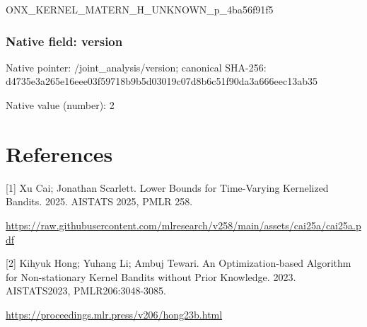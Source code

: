 \documentclass[10pt,a4paper]{article}
\begin{document}
\begingroup\raggedright\sloppy ONX\_\allowbreak{}KERNEL\_\allowbreak{}MATERN\_\allowbreak{}H\_\allowbreak{}UNKNOWN\_\allowbreak{}p\_\allowbreak{}4ba56f91f5\par\endgroup

\subsubsection{Native field: version}
Native pointer: /joint\_\allowbreak{}analysis/version; canonical SHA-256: d4735e3a265e16eee03f59718b9b5d03019c07d8b6c51f90da3a666eec13ab35

Native value (number): 2

\section{References}
[1] Xu Cai; Jonathan Scarlett. Lower Bounds for Time-Varying Kernelized Bandits. 2025. AISTATS 2025, PMLR 258.

\url{https://raw.githubusercontent.com/mlresearch/v258/main/assets/cai25a/cai25a.pdf}

[2] Kihyuk Hong; Yuhang Li; Ambuj Tewari. An Optimization-based Algorithm for Non-stationary Kernel Bandits without Prior Knowledge. 2023. AISTATS2023, PMLR206:3048-3085.

\url{https://proceedings.mlr.press/v206/hong23b.html}
\end{document}
